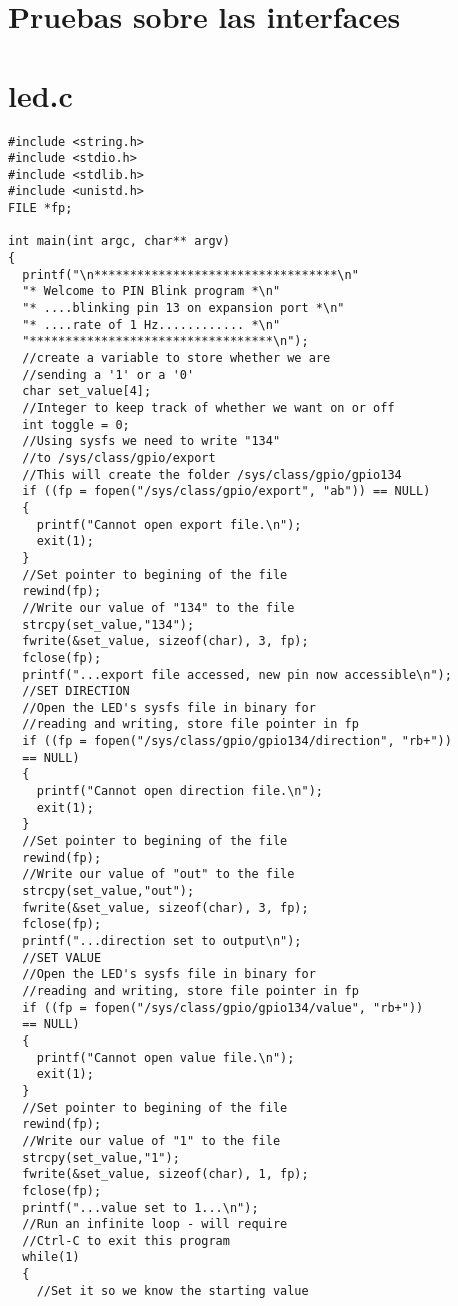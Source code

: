 \section{Pruebas sobre las interfaces}

\section{led.c}\label{anx_sw_led}

\begin{verbatim}
#include <string.h>
#include <stdio.h>
#include <stdlib.h>
#include <unistd.h>
FILE *fp;

int main(int argc, char** argv)
{
  printf("\n**********************************\n"
  "* Welcome to PIN Blink program *\n"
  "* ....blinking pin 13 on expansion port *\n"
  "* ....rate of 1 Hz............ *\n"
  "**********************************\n");
  //create a variable to store whether we are 
  //sending a '1' or a '0'
  char set_value[4];
  //Integer to keep track of whether we want on or off
  int toggle = 0;
  //Using sysfs we need to write "134" 
  //to /sys/class/gpio/export
  //This will create the folder /sys/class/gpio/gpio134
  if ((fp = fopen("/sys/class/gpio/export", "ab")) == NULL)
  {
    printf("Cannot open export file.\n");
    exit(1);
  }
  //Set pointer to begining of the file
  rewind(fp);
  //Write our value of "134" to the file
  strcpy(set_value,"134");
  fwrite(&set_value, sizeof(char), 3, fp);
  fclose(fp);
  printf("...export file accessed, new pin now accessible\n");
  //SET DIRECTION
  //Open the LED's sysfs file in binary for 
  //reading and writing, store file pointer in fp
  if ((fp = fopen("/sys/class/gpio/gpio134/direction", "rb+")) 
  == NULL)
  {
    printf("Cannot open direction file.\n");
    exit(1);
  }
  //Set pointer to begining of the file
  rewind(fp);
  //Write our value of "out" to the file
  strcpy(set_value,"out");
  fwrite(&set_value, sizeof(char), 3, fp);
  fclose(fp);
  printf("...direction set to output\n");
  //SET VALUE
  //Open the LED's sysfs file in binary for 
  //reading and writing, store file pointer in fp
  if ((fp = fopen("/sys/class/gpio/gpio134/value", "rb+")) 
  == NULL)
  {
    printf("Cannot open value file.\n");
    exit(1);
  }
  //Set pointer to begining of the file
  rewind(fp);
  //Write our value of "1" to the file
  strcpy(set_value,"1");
  fwrite(&set_value, sizeof(char), 1, fp);
  fclose(fp);
  printf("...value set to 1...\n");
  //Run an infinite loop - will require 
  //Ctrl-C to exit this program
  while(1)
  {
    //Set it so we know the starting value 

\end{verbatim}
